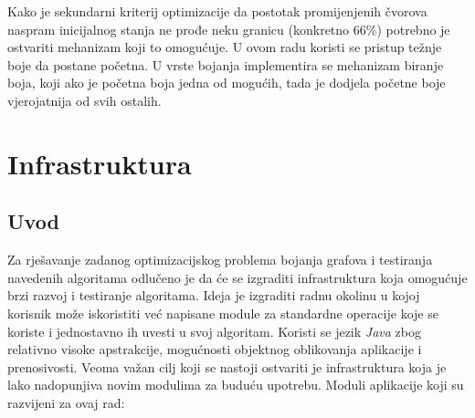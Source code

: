 \documentclass[times, utf8, diplomski, numeric]{fer}
\begin{document}
Kako je sekundarni kriterij optimizacije da postotak promijenjenih čvorova naspram inicijalnog stanja ne prođe neku granicu (konkretno 66\%) potrebno je ostvariti mehanizam koji to omogućuje. U ovom radu koristi se pristup težnje boje da postane početna. U vrste bojanja implementira se mehanizam biranje boja, koji ako je početna boja jedna od mogućih, tada je dodjela početne boje vjerojatnija od svih ostalih. 

\chapter{Infrastruktura}

\section{Uvod}

Za rješavanje zadanog optimizacijskog problema bojanja grafova i testiranja navedenih algoritama odlučeno je da će se izgraditi infrastruktura koja omogućuje brzi razvoj i testiranje algoritama. Ideja je izgraditi radnu okolinu u kojoj korisnik može iskoristiti već napisane module za standardne operacije koje se koriste i jednostavno ih uvesti u svoj algoritam. Koristi se jezik \emph{Java} zbog relativno visoke apstrakcije, mogućnosti objektnog oblikovanja aplikacije i prenosivosti. Veoma važan cilj koji se nastoji ostvariti je infrastruktura koja je lako nadopunjiva novim modulima za buduću upotrebu. Moduli aplikacije koji su razvijeni za ovaj rad:
\end{document}
